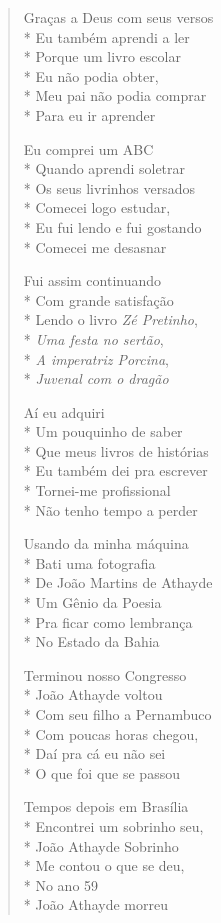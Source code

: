 \begin{verse}
Graças a Deus com seus versos\\*
Eu também aprendi a ler\\*
Porque um livro escolar\\*
Eu não podia obter,\\*
Meu pai não podia comprar\\*
Para eu ir aprender

Eu comprei um ABC\\*
Quando aprendi soletrar\\*
Os seus livrinhos versados\\*
Comecei logo estudar,\\*
Eu fui lendo e fui gostando\\*
Comecei me desasnar

Fui assim continuando\\*
Com grande satisfação\\*
Lendo o livro \textit{Zé Pretinho},\\*
\textit{Uma festa no sertão},\\*
\textit{A imperatriz Porcina},\\*
\textit{Juvenal com o dragão}

Aí eu adquiri\\*
Um pouquinho de saber\\*
Que meus livros de histórias\\*
Eu também dei pra escrever\\*
Tornei-me profissional\\*
Não tenho tempo a perder

Usando da minha máquina\\*
Bati uma fotografia\\*
De João Martins de Athayde\\*
Um Gênio da Poesia\\*
Pra ficar como lembrança\\*
No Estado da Bahia

Terminou nosso Congresso\\*
João Athayde voltou\\*
Com seu filho a Pernambuco\\*
Com poucas horas chegou,\\*
Daí pra cá eu não sei\\*
O que foi que se passou

Tempos depois em Brasília\\*
Encontrei um sobrinho seu,\\*
João Athayde Sobrinho\\*
Me contou o que se deu,\\*
No ano 59\\*
João Athayde morreu


\end{verse}
